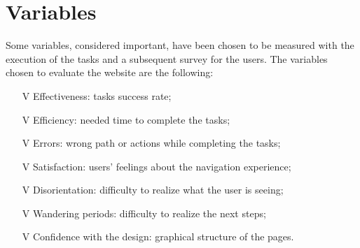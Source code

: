 \documentclass[../../UsabilityReport.tex]{subfiles}
\begin{document}
\section{Variables}\label{2.3}
	Some variables, considered important, have been chosen to be measured with the execution of the tasks and a subsequent survey for the users. The variables chosen to evaluate the website are the following:
	\begin{itemize}
		\item[V\subs{1}] Effectiveness: tasks success rate;
		\item[V\subs{2}] Efficiency: needed time to complete the tasks;
		\item[V\subs{3}] Errors: wrong path or actions while completing the tasks;
		\item[V\subs{4}] Satisfaction: users' feelings about the navigation experience;
		\item[V\subs{5}] Disorientation: difficulty to realize what the user is seeing;
		\item[V\subs{6}] Wandering periods: difficulty to realize the next steps;
		\item[V\subs{7}] Confidence with the design: graphical structure of the pages.
	\end{itemize}
\end{document}
